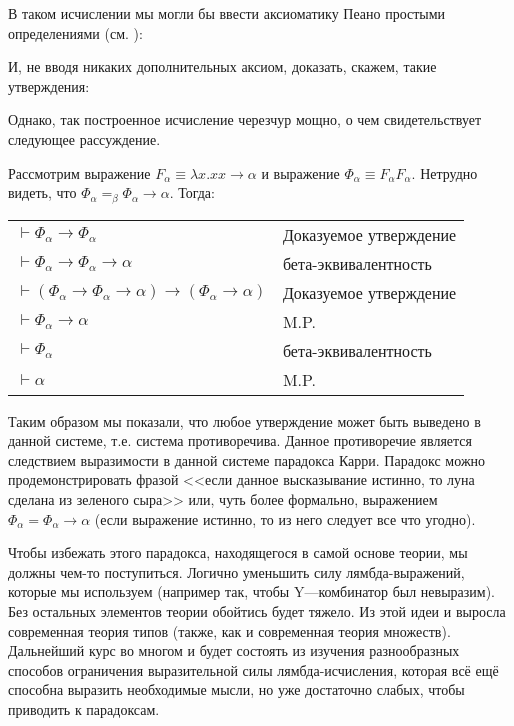 В таком исчислении мы могли бы ввести аксиоматику Пеано простыми
определениями (см. ):

И, не вводя никаких дополнительных аксиом, доказать, скажем,
такие утверждения:

Однако, так построенное исчисление черезчур мощно, о чем свидетельствует
следующее рассуждение.

Рассмотрим выражение $F_\alpha \equiv \lambda x. x x \rightarrow \alpha$ 
и выражение $\Phi_\alpha \equiv F_\alpha F_\alpha$.
Нетрудно видеть, что $\Phi_\alpha =_\beta \Phi_\alpha\rightarrow\alpha$.
Тогда:

\begin{tabular}{ll}
$\vdash\Phi_\alpha\rightarrow\Phi_\alpha$ & Доказуемое утверждение\\
$\vdash\Phi_\alpha\rightarrow\Phi_\alpha\rightarrow\alpha$ & бета-эквивалентность\\
$\vdash(\Phi_\alpha\rightarrow\Phi_\alpha\rightarrow\alpha)\rightarrow(\Phi_\alpha\rightarrow\alpha)$ & Доказуемое утверждение\\
$\vdash\Phi_\alpha\rightarrow\alpha$ & M.P.\\
$\vdash\Phi_\alpha$ & бета-эквивалентность\\
$\vdash\alpha$ & M.P.
\end{tabular}

Таким образом мы показали, что любое утверждение может быть выведено в данной
системе, т.е. система противоречива. Данное противоречие является следствием выразимости
в данной системе парадокса Карри. Парадокс можно продемонстрировать фразой
<<если данное высказывание истинно, то луна сделана из зеленого сыра>> или, чуть более формально,
выражением $\Phi_\alpha = \Phi_\alpha\rightarrow\alpha$ (если выражение истинно, 
то из него следует все что угодно). 

Чтобы избежать этого парадокса, находящегося в самой основе теории, мы должны чем-то поступиться.
Логично уменьшить силу лямбда-выражений, которые мы используем (например так, чтобы Y---комбинатор
был невыразим). Без остальных элементов теории обойтись будет тяжело. Из этой идеи и выросла 
современная теория типов (также, как и современная
теория множеств). Дальнейший курс во многом и будет состоять из изучения разнообразных способов
ограничения выразительной силы лямбда-исчисления, которая всё ещё способна выразить необходимые 
мысли, но уже достаточно слабых, чтобы приводить к парадоксам.


